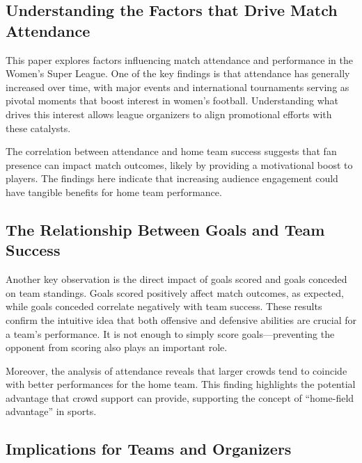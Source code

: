 \documentclass[
  letterpaper,
  DIV=11,
  numbers=noendperiod]{scrartcl}
\begin{document}
\hypertarget{sec-first-point}{%
\subsection{Understanding the Factors that Drive Match
Attendance}\label{sec-first-point}}

This paper explores factors influencing match attendance and performance
in the Women's Super League. One of the key findings is that attendance
has generally increased over time, with major events and international
tournaments serving as pivotal moments that boost interest in women's
football. Understanding what drives this interest allows league
organizers to align promotional efforts with these catalysts.

The correlation between attendance and home team success suggests that
fan presence can impact match outcomes, likely by providing a
motivational boost to players. The findings here indicate that
increasing audience engagement could have tangible benefits for home
team performance.

\hypertarget{the-relationship-between-goals-and-team-success}{%
\subsection{The Relationship Between Goals and Team
Success}\label{the-relationship-between-goals-and-team-success}}

Another key observation is the direct impact of goals scored and goals
conceded on team standings. Goals scored positively affect match
outcomes, as expected, while goals conceded correlate negatively with
team success. These results confirm the intuitive idea that both
offensive and defensive abilities are crucial for a team's performance.
It is not enough to simply score goals---preventing the opponent from
scoring also plays an important role.

Moreover, the analysis of attendance reveals that larger crowds tend to
coincide with better performances for the home team. This finding
highlights the potential advantage that crowd support can provide,
supporting the concept of ``home-field advantage'' in sports.

\hypertarget{implications-for-teams-and-organizers}{%
\subsection{Implications for Teams and
Organizers}\label{implications-for-teams-and-organizers}}
\end{document}
